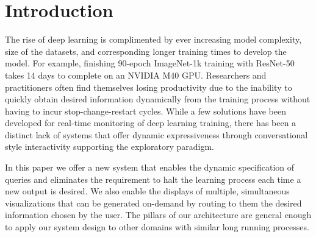\documentclass[sigchi]{acmart}
\begin{document}






\maketitle

\section{Introduction}
The rise of deep learning is complimented by ever increasing model complexity, size of the datasets, and corresponding longer training times to develop the model. For example, finishing 90-epoch ImageNet-1k training with ResNet-50 takes 14 days to complete on an NVIDIA M40 GPU\cite{You:2018:ITM:3225058.3225069}. Researchers and practitioners often find themselves losing productivity due to the inability to quickly obtain desired information dynamically from the training process without having to incur stop-change-restart cycles.  While a few solutions have been developed for real-time monitoring of deep learning training, there has been a distinct lack of systems that offer dynamic expressiveness through conversational style interactivity supporting the exploratory paradigm.

In this paper we offer a new system that enables the dynamic specification of queries and eliminates the requirement to halt the learning process each time a new output is desired. We also enable the displays of multiple, simultaneous visualizations that can be generated on-demand by routing to them the desired information chosen by the user. The pillars of our architecture are general enough to apply our system design to other domains with similar long running processes.
\end{document}
